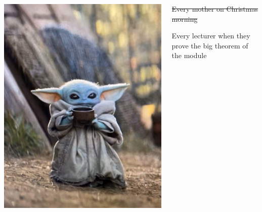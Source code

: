\documentclass{beamer}
\begin{document}
\begin{frame}{}
\begin{columns}
\begin{column}{0.5\textwidth}
    \includegraphics[width=\textwidth,height=0.8\textheight,keepaspectratio]{YodaTea.jpeg}
\end{column}



\begin{column}{0.5\textwidth}
\sout{Every mother on Christmas morning}

Every lecturer when they prove the big theorem of the module

\end{column}
\end{columns}
\end{frame}
\end{document}
